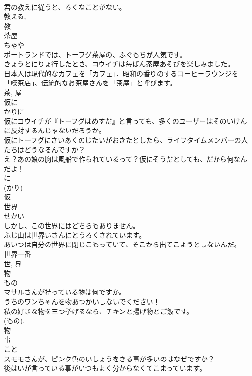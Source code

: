 \documentclass[8pt]{extreport}
\begin{document}
\begin{CJK}{UTF8}{min}
\\	君の教えに従うと、ろくなことがない。	
\\	教える, 
\\	教	
\\	茶屋	
\\	ちゃや	
\\	ポートランドでは、トーフグ茶屋の、ふぐもちが人気です。	
\\	きょうとにりょ行したとき、コウイチは毎ばん茶屋あそびを楽しみました。	
\\	日本人は現代的なカフェを「カフェ」、昭和の香りのするコーヒーラウンジを「喫茶店」、伝統的なお茶屋さんを「茶屋」と呼びます。	
\\	茶, 屋	
\\	仮に	
\\	かりに	
\\	仮にコウイチが『トーフグはめすだ』と言っても、多くのユーザーはそのいけんに反対するんじゃないだろうか。	
\\	仮にトーフグにさいあくのじたいがおきたとしたら、ライフタイムメンバーの人たちはどうなるんですか？	
\\	え？あの娘の胸は風船で作られているって？仮にそうだとしても、だから何なんだよ！	
\\	に 
\\	(かり) 
\\	仮	
\\	世界	
\\	せかい	
\\	しかし、この世界にはどちらもありません。	
\\	ふじ山は世界いさんにとうろくされています。	
\\	あいつは自分の世界に閉じこもっていて、そこから出てこようとしないんだ。	
\\	世界一番 
\\	世, 界	
\\	物	
\\	もの	
\\	マサルさんが持っている物は何ですか。	
\\	うちのワンちゃんを物あつかいしないでください！	
\\	私の好きな物を三つ挙げるなら、チキンと揚げ物とご飯です。	
\\	(もの). 
\\	物	
\\	事	
\\	こと	
\\	スモモさんが、ピンク色のいしょうをきる事が多いのはなぜですか？	
\\	後はいが言っている事がいつもよく分からなくてこまっています。	

\end{CJK}
\end{document}

